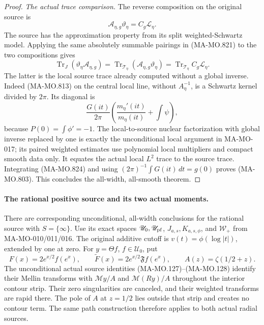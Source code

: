 \begin{proof}
\emph{The actual trace comparison.}
The reverse composition on the original source is
\[
 \mathcal A_{\eta,g}\vartheta_\eta
                       =C_g\mathcal L_\eta .
 \tag{MA-MO.822}
\]
The source has the approximation property from its
split weighted-Schwartz model. Applying the same
absolutely summable pairings in (MA-MO.821) to
the two compositions gives
\[
 \operatorname{Tr}_{J}
          (\vartheta_\eta\mathcal A_{\eta,g})
     =\operatorname{Tr}_{\mathcal T_\eta}
          (\mathcal A_{\eta,g}\vartheta_\eta)
     =\operatorname{Tr}_{\mathcal T_\eta}C_g\mathcal L_\eta .
 \tag{MA-MO.823}
\]
The latter is the local source trace already computed
without a global inverse. Indeed (MA-MO.813) on the
central local line, without \(A_\eta^{-1}\), is a
Schwartz kernel divided by \(2\pi\). Its diagonal is
\[
       \frac{G(it)}{2\pi}
          \left(\frac{m_\eta'(it)}{m_\eta(it)}
                         +\int\psi\right),
 \tag{MA-MO.824}
\]
because \(P(0)=\int\phi'=-1\).
The local-to-source nuclear factorization with global
inverse replaced by one is exactly the unconditional
local argument in MA-MO-017; its paired weighted
estimates use polynomial local multipliers and compact
smooth data only. It equates the actual local \(L^2\)
trace to the source trace. Integrating (MA-MO.824)
and using \((2\pi)^{-1}\int G(it)\,dt=g(0)\)
proves (MA-MO.803).
This concludes the all-width, all-smooth theorem.
\end{proof}

\paragraph{The rational positive source and its two actual moments.}
There are corresponding unconditional, all-width conclusions
for the rational source with \(S=\{\infty\}\).
Use its exact spaces \(\mathscr U_0,\mathscr U_{\rm pf}\),
\(J_{a,s},K_{a,s,\phi}\), and \(\mathcal W_+\) from
MA-MO-010/011/016. The original additive cutoff is
\(v(t)=\phi(\log|t|)\), extended by one at zero.
For \(y=\Theta f\), \(f\in\mathscr U_0\), put
\[
 F(x)=2e^{x/2}f(e^x),\qquad
 \widetilde F(x)=2e^{x/2}\mathfrak Ff(e^x),\qquad
                A(z)=\zeta(1/2+z).
 \tag{MA-MO.825}
\]
The unconditional actual source identities
(MA-MO.127)--(MA-MO.128) identify their Mellin transforms
with \(\mathcal My/A\) and \(\mathcal M(Ry)/A\)
throughout the interior contour strip. Their zero
singularities are canceled, and their weighted transforms
are rapid there. The pole of \(A\) at \(z=1/2\) lies
outside that strip and creates no contour term.
The same path construction therefore applies to both
actual radial sources.

